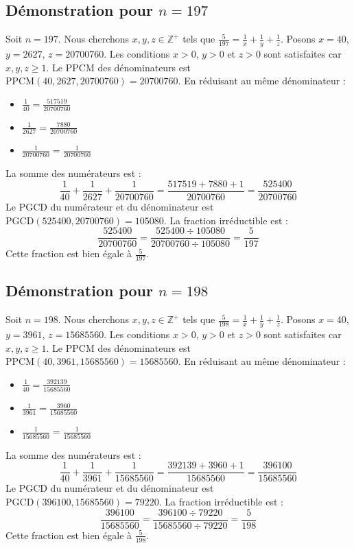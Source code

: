\documentclass[11pt,a4paper]{article}
\begin{document}
\subsection{Démonstration pour $n = 197$}
Soit $n = 197$. Nous cherchons $x, y, z \in \mathbb{Z}^{+}$ tels que $\frac{5}{197} = \frac{1}{x} + \frac{1}{y} + \frac{1}{z}$.
Posons $x = 40$, $y = 2627$, $z = 20700760$.
Les conditions $x > 0$, $y > 0$ et $z > 0$ sont satisfaites car $x, y, z \geq 1$.
Le PPCM des dénominateurs est $\text{PPCM}(40, 2627, 20700760) = 20700760$.
En réduisant au même dénominateur :
\begin{itemize}
    \item $\frac{1}{40} = \frac{517519}{20700760}$
    \item $\frac{1}{2627} = \frac{7880}{20700760}$
    \item $\frac{1}{20700760} = \frac{1}{20700760}$
\end{itemize}
La somme des numérateurs est :
$$ \frac{1}{40} + \frac{1}{2627} + \frac{1}{20700760} = \frac{517519 + 7880 + 1}{20700760} = \frac{525400}{20700760} $$
Le PGCD du numérateur et du dénominateur est $\text{PGCD}(525400, 20700760) = 105080$.
La fraction irréductible est :
$$ \frac{525400}{20700760} = \frac{525400 \div 105080}{20700760 \div 105080} = \frac{5}{197} $$
Cette fraction est bien égale à $\frac{5}{197}$.

\subsection{Démonstration pour $n = 198$}
Soit $n = 198$. Nous cherchons $x, y, z \in \mathbb{Z}^{+}$ tels que $\frac{5}{198} = \frac{1}{x} + \frac{1}{y} + \frac{1}{z}$.
Posons $x = 40$, $y = 3961$, $z = 15685560$.
Les conditions $x > 0$, $y > 0$ et $z > 0$ sont satisfaites car $x, y, z \geq 1$.
Le PPCM des dénominateurs est $\text{PPCM}(40, 3961, 15685560) = 15685560$.
En réduisant au même dénominateur :
\begin{itemize}
    \item $\frac{1}{40} = \frac{392139}{15685560}$
    \item $\frac{1}{3961} = \frac{3960}{15685560}$
    \item $\frac{1}{15685560} = \frac{1}{15685560}$
\end{itemize}
La somme des numérateurs est :
$$ \frac{1}{40} + \frac{1}{3961} + \frac{1}{15685560} = \frac{392139 + 3960 + 1}{15685560} = \frac{396100}{15685560} $$
Le PGCD du numérateur et du dénominateur est $\text{PGCD}(396100, 15685560) = 79220$.
La fraction irréductible est :
$$ \frac{396100}{15685560} = \frac{396100 \div 79220}{15685560 \div 79220} = \frac{5}{198} $$
Cette fraction est bien égale à $\frac{5}{198}$.
\end{document}
